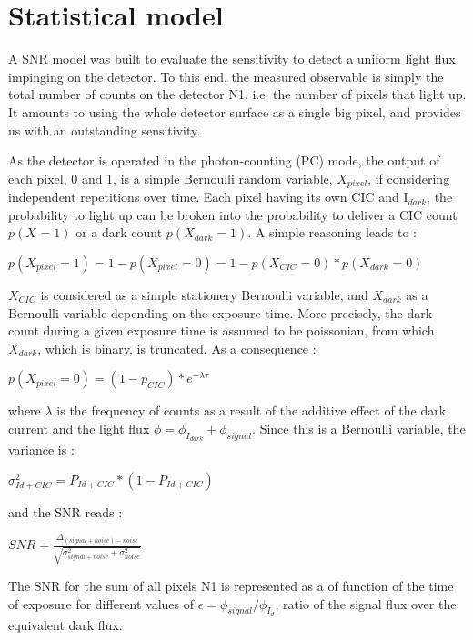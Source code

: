 
\section{Statistical model}

A SNR model was built to evaluate the sensitivity to detect a uniform light flux impinging on the detector. To this end, the measured observable is simply the total number of counts on the detector N1, i.e. the number of pixels that light up. 
It amounts to using the whole detector surface as a single big pixel, and provides us with an outstanding sensitivity.\par
 
As the detector is operated in the photon-counting (PC) mode, the output of each pixel, 0 and 1, is a simple Bernoulli random variable, $X_{pixel}$, if considering independent repetitions over time.
Each pixel having its own CIC and I$_{dark}$, the probability to light up can be broken into the probability to deliver a CIC count $p(X_{}=1)$ or a dark count $p(X_{dark}=1)$.  A simple reasoning leads to : 

\medskip
\centerline{$p(X_{pixel}=1) = 1- p(X_{pixel}=0)= 1-  p(X_{CIC}=0)*p(X_{dark}=0)$}
\medskip
 
$X_{CIC}$ is considered as a simple stationery Bernoulli variable, and $X_{dark}$ as a Bernoulli variable depending on the exposure time.
More precisely, the dark count during a given exposure time is assumed to be poissonian, from which $X_{dark}$, which is binary, is truncated. As a consequence :  

\medskip
\centerline{$p(X_{pixel}=0) = (1-p_{CIC}) * e^{- \lambda \tau}$}
\medskip
 
where $\lambda$ is the frequency of counts as a result of the additive effect of the dark current and the light flux  $\phi = \phi_{I_{dark}} + \phi_{signal} $.
Since this is a Bernoulli variable, the variance is :

\medskip
\centerline{ $\sigma^2_{Id+CIC} = P_{Id+CIC} * (1-P_{Id+CIC})$ }
\medskip
 
and the SNR reads :

\medskip
\centerline{$SNR = \frac{\Delta_{(signal+noise)-noise}}{\sqrt{\sigma^2_{signal+noise}+\sigma^2_{noise}}}$}
\bigskip

The SNR for the sum of all pixels N1 is represented as a of function of the time of exposure for different values of $\epsilon = \phi_{signal}/\phi_{I_{d}}$, ratio of the signal flux over the equivalent dark flux.
